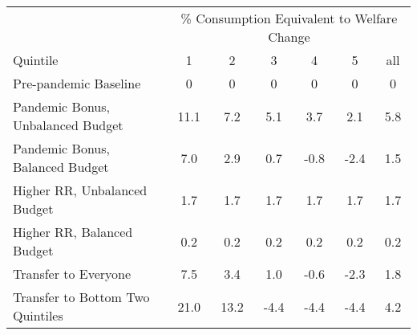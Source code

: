 \begin{center}
\begin{adjustbox}{width=\textwidth}
\begin{tabular}{lcccccc}\toprule
 & \multicolumn{6}{c}{\% Consumption Equivalent to Welfare Change} \\
\cline{2-7}
Quintile & 1 & 2 & 3 & 4 & 5 & all \\
\midrule
Pre-pandemic Baseline & 0 & 0 & 0 & 0 & 0 & 0 \\
Pandemic Bonus, Unbalanced Budget & 11.1 & 7.2 & 5.1 & 3.7 & 2.1 & 5.8 \\
Pandemic Bonus, Balanced Budget & 7.0 & 2.9 & 0.7 & -0.8 & -2.4 & 1.5 \\
Higher RR, Unbalanced Budget & 1.7 & 1.7 & 1.7 & 1.7 & 1.7 & 1.7 \\
Higher RR, Balanced Budget & 0.2 & 0.2 & 0.2 & 0.2 & 0.2 & 0.2 \\
Transfer to Everyone & 7.5 & 3.4 & 1.0 & -0.6 & -2.3 & 1.8 \\
Transfer to Bottom Two Quintiles & 21.0 & 13.2 & -4.4 & -4.4 & -4.4 & 4.2 \\
\bottomrule\end{tabular}
\end{adjustbox}
\end{center}
